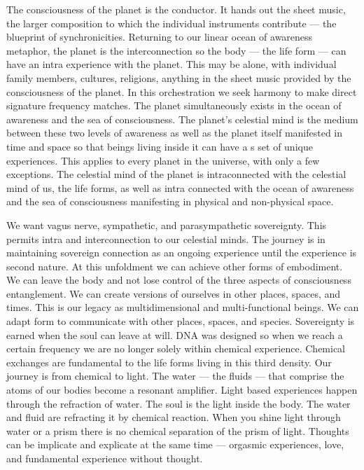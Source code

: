 The consciousness of the planet is the conductor. It hands out the sheet
music, the larger composition to which the individual instruments
contribute --- the blueprint of synchronicities. Returning to our linear
ocean of awareness metaphor, the planet is the interconnection so the
body --- the life form --- can have an intra experience with the planet.
This may be alone, with individual family members, cultures, religions,
anything in the sheet music provided by the consciousness of the planet.
In this orchestration we seek harmony to make direct signature frequency
matches. The planet simultaneously exists in the ocean of awareness and
the sea of consciousness. The planet's celestial mind is the medium
between these two levels of awareness as well as the planet itself
manifested in time and space so that beings living inside it can have a
s set of unique experiences. This applies to every planet in the
universe, with only a few exceptions. The celestial mind of the planet
is intraconnected with the celestial mind of us, the life forms, as well
as intra connected with the ocean of awareness and the sea of
consciousness manifesting in physical and non-physical space.

We want vagus nerve, sympathetic, and parasympathetic sovereignty. This
permits intra and interconnection to our celestial minds. The journey is
in maintaining sovereign connection as an ongoing experience until the
experience is second nature. At this unfoldment we can achieve other
forms of embodiment. We can leave the body and not lose control of the
three aspects of consciousness entanglement. We can create versions of
ourselves in other places, spaces, and times. This is our legacy as
multidimensional and multi-functional beings. We can adapt form to
communicate with other places, spaces, and species. Sovereignty is
earned when the soul can leave at will. DNA was designed so when we
reach a certain frequency we are no longer solely within chemical
experience. Chemical exchanges are fundamental to the life forms living
in this third density. Our journey is from chemical to light. The water
--- the fluids --- that comprise the atoms of our bodies become a
resonant amplifier. Light based experiences happen through the
refraction of water. The soul is the light inside the body. The water
and fluid are refracting it by chemical reaction. When you shine light
through water or a prism there is no chemical separation of the prism of
light. Thoughts can be implicate and explicate at the same time ---
orgasmic experiences, love, and fundamental experience without thought.

